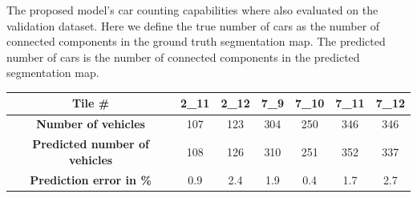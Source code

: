 \documentclass{kththesis}
\begin{document}
\noindent The proposed model's car counting capabilities where also evaluated on the validation dataset. Here we define the true number of cars as the number of connected components in the ground truth segmentation map. The predicted number of cars is the number of connected components in the predicted segmentation map.
\begin{center}
\begin{tabular}{|c c c c c c c|}
\hline
\textbf{Tile \#} & 2\_11  & 2\_12 & 7\_9 & 7\_10 & 7\_11 & 7\_12 \\
\hline
\textbf{Number of vehicles} & 107 & 123 & 304 & 250 & 346 & 346 \\
\textbf{Predicted number of vehicles} & 108 & 126 & 310 & 251 & 352 & 337 \\
\textbf{Prediction error in \%} &0.9 &  2.4 & 1.9 & 0.4 & 1.7 & 2.7\\
\hline
\end{tabular}
\end{center}
\end{document}
